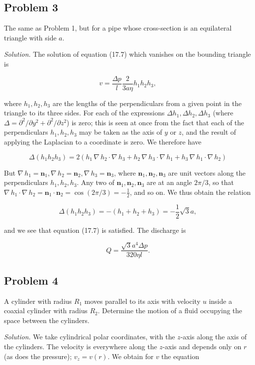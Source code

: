 \documentclass{article}
\begin{document}
\subsection*{Problem 3}

The same as Problem 1, but for a pipe whose cross-section is an equilateral triangle with side $a$.

\textit{Solution.} The solution of equation (17.7) which vanishes on the bounding triangle is

$$
v = \frac{\Delta p}{l} \frac{2}{3a\eta} h_1 h_2 h_3,
$$

where $h_1, h_2, h_3$ are the lengths of the perpendiculars from a given point in the triangle to its three sides. For each of the expressions $\Delta h_1, \Delta h_2, \Delta h_3$ (where $\Delta = \partial^2/\partial y^2 + \partial^2/\partial z^2$) is zero; this is seen at once from the fact that each of the perpendiculars $h_1, h_2, h_3$ may be taken as the axis of $y$ or $z$, and the result of applying the Laplacian to a coordinate is zero. We therefore have

$$
\Delta (h_1 h_2 h_3) = 2(h_1 \, \nabla \, h_2 \cdot \nabla \, h_3 + h_2 \, \nabla \, h_3 \cdot \nabla \, h_1 + h_3 \, \nabla \, h_1 \cdot \nabla \, h_2)
$$

But $\nabla \, h_1 = \mathbf{n}_1, \nabla \, h_2 = \mathbf{n}_2, \nabla \, h_3 = \mathbf{n}_3$, where $\mathbf{n}_1, \mathbf{n}_2, \mathbf{n}_3$ are unit vectors along the perpendiculars $h_1, h_2, h_3$. Any two of $\mathbf{n}_1, \mathbf{n}_2, \mathbf{n}_3$ are at an angle $2\pi/3$, so that $\nabla \, h_1 \cdot \nabla \, h_2 = \mathbf{n}_1 \cdot \mathbf{n}_2 = \cos(2\pi/3) = -\frac{1}{2}$, and so on. We thus obtain the relation

$$
\Delta (h_1 h_2 h_3) = -(h_1 + h_2 + h_3) = -\frac{1}{2} \sqrt{3} a,
$$

and we see that equation (17.7) is satisfied. The discharge is

$$
Q = \frac{\sqrt{3} a^4 \Delta p}{320 \eta l}.
$$

\subsection*{Problem 4}

A cylinder with radius $R_1$ moves parallel to its axis with velocity $u$ inside a coaxial cylinder with radius $R_2$. Determine the motion of a fluid occupying the space between the cylinders.

\textit{Solution.} We take cylindrical polar coordinates, with the $z$-axis along the axis of the cylinders. The velocity is everywhere along the $z$-axis and depends only on $r$ (as does the pressure); $v_z = v(r)$. We obtain for $v$ the equation
\end{document}

